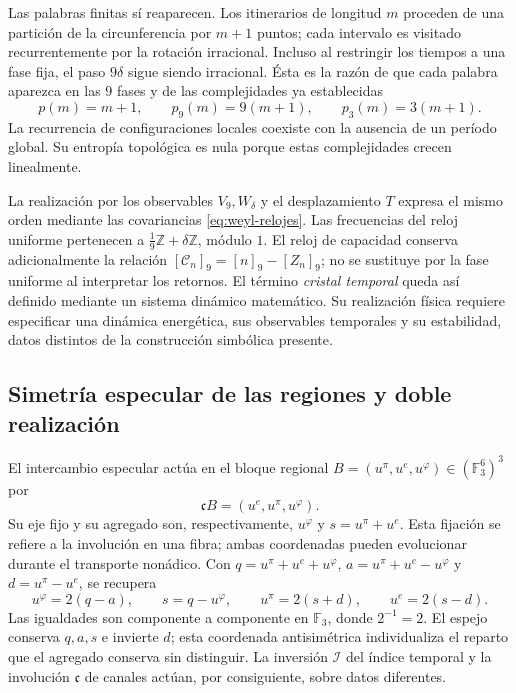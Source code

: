 Las palabras finitas sí reaparecen. Los itinerarios de longitud \(m\)
proceden de una partición de la circunferencia por \(m+1\) puntos; cada
intervalo es visitado recurrentemente por la rotación irracional. Incluso
al restringir los tiempos a una fase fija, el paso \(9\delta\) sigue
siendo irracional. Ésta es la razón de que cada palabra aparezca en las
\(9\) fases y de las complejidades ya establecidas
\[
 p(m)=m+1,\qquad p_9(m)=9(m+1),\qquad p_3(m)=3(m+1).
\]
La recurrencia de configuraciones locales coexiste con la ausencia de un
período global. Su entropía topológica es nula porque estas complejidades
crecen linealmente.

La realización por los observables \(V_9,W_\delta\) y el desplazamiento
\(T\) expresa el mismo orden mediante las covariancias
\eqref{eq:weyl-relojes}. Las frecuencias del reloj uniforme pertenecen a
\(\frac19\mathbb Z+\delta\mathbb Z\), módulo \(1\). El reloj de
capacidad conserva adicionalmente la relación
\([\mathcal C_n]_9=[n]_9-[Z_n]_9\); no se sustituye por la fase uniforme
al interpretar los retornos. El término \emph{cristal temporal} queda así
definido mediante un sistema dinámico matemático. Su realización física
requiere especificar una dinámica energética, sus observables temporales
y su estabilidad, datos distintos de la construcción simbólica presente.

\subsection{Simetría especular de las regiones y doble realización}
\label{mono-ampl:regiones}

El intercambio especular actúa en el bloque regional
\(B=(u^\pi,u^e,u^\varphi)\in(\mathbb F_3^6)^3\) por
\[
 \mathfrak cB=(u^e,u^\pi,u^\varphi).
\]
Su eje fijo y su agregado son, respectivamente, \(u^\varphi\) y
\(s=u^\pi+u^e\). Esta fijación se refiere a la involución en una fibra;
ambas coordenadas pueden evolucionar durante el transporte nonádico.
Con \(q=u^\pi+u^e+u^\varphi\),
\(a=u^\pi+u^e-u^\varphi\) y \(d=u^\pi-u^e\), se recupera
\[
 u^\varphi=2(q-a),\qquad s=q-u^\varphi,\qquad
 u^\pi=2(s+d),\qquad u^e=2(s-d).
\]
Las igualdades son componente a componente en \(\mathbb F_3\), donde
\(2^{-1}=2\). El espejo conserva \(q,a,s\) e invierte \(d\); esta
coordenada antisimétrica individualiza el reparto que el agregado conserva
sin distinguir. La inversión \(\mathcal I\) del índice temporal y la
involución \(\mathfrak c\) de canales actúan, por consiguiente, sobre
datos diferentes.

